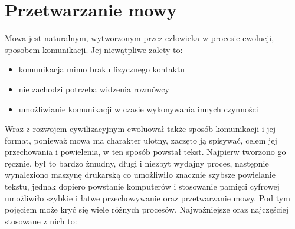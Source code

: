 \section{Przetwarzanie mowy}
Mowa jest naturalnym, wytworzonym przez człowieka w procesie ewolucji, sposobem komunikacji. Jej niewątpliwe zalety to:
\begin{itemize}
	\item komunikacja mimo braku fizycznego kontaktu
	\item nie zachodzi potrzeba widzenia rozmówcy
	\item umożliwianie komunikacji w czasie wykonywania innych czynności
\end{itemize}
Wraz z rozwojem cywilizacyjnym ewoluował także sposób komunikacji i jej format, ponieważ mowa ma charakter ulotny, zaczęto ją spisywać, celem jej przechowania i powielenia, w ten sposób powstał tekst. Najpierw tworzono go ręcznie, był to bardzo żmudny, długi i niezbyt wydajny proces, następnie wynaleziono maszynę drukarską co umożliwiło znacznie szybsze powielanie tekstu, jednak dopiero powstanie komputerów i stosowanie pamięci cyfrowej umożliwiło szybkie i łatwe przechowywanie oraz przetwarzanie mowy. Pod tym pojęciem może kryć się wiele różnych procesów. Najważniejsze oraz najczęściej stosowane z nich to:
